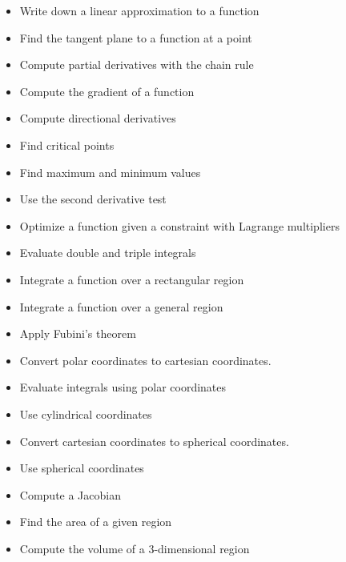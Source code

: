 \documentclass[12pt]{article}
\begin{document}
\begin{multicols}{2}
\begin{itemize}
\item Write down a linear approximation to a function
\item Find the tangent plane to a function at a point
\item Compute partial derivatives with the chain rule
\item Compute the gradient of a function
\item Compute directional derivatives
\item Find critical points
\item Find maximum and minimum values
\item Use the second derivative test
\item Optimize a function given a constraint with Lagrange multipliers
\item Evaluate double and triple integrals
\item Integrate a function over a rectangular region
\item Integrate a function over a general region
\item Apply Fubini's theorem
\item Convert polar coordinates to cartesian coordinates.
\item Evaluate integrals using polar coordinates
\item Use cylindrical coordinates
\item Convert cartesian coordinates to spherical coordinates.
\item Use spherical coordinates
\item Compute a Jacobian
\item Find the area of a given region
\item Compute the volume of a 3-dimensional region
\end{itemize}
\end{multicols}
\end{document}
